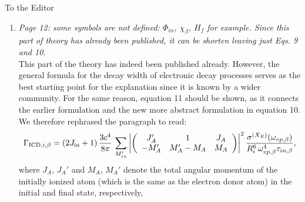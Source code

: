 \documentclass[DIN,pagenumber=false,parskip=half,fromalign=left,fromphone=true,fromemail=true,fromurl=false,fromlogo=false,fromrule=false]{scrlttr2}
\begin{document}
\begin{letter}{To the Editor}
\begin{enumerate}
  \item \emph{Page 12:
        some symbols are not defined: $\Phi_{in}$, $\chi_\beta$, $H_f$
        for example.
        Since this part of theory has already been published, it can be shorten
        leaving just Eqs. 9 and 10.}\\
        This part of the theory has indeed been published already. However,
        the general formula for the decay width of electronic decay processes
        serves as the best starting point for the explanation since it is
        known by a wider community. For the same reason, equation 11 should
        be shown, as it connects the earlier formulation and the new more
        abstract formulation in equation 10. We therefore rephrased the
        paragraph to read:\\
        {}
%
\begin{equation}
 \Gamma_{{\rm ICD},i,\beta} = (2J_{\rm in}+1)\, \frac{3c^4}{8\pi}\,
                        \sum\limits_{M_{in}'}
                        \left| \left(
                        \begin{array}{ccc}
                        J_A'  & 1        & J_A\\
                        -M_A' & M_A'-M_A & M_A
                        \end{array}\right) \right|^2
                        \frac{\sigma^{(X_E)}(\omega_{vp,\beta})}
                        {R_i^6 \, \omega_{vp,\beta}^4 \tau_{in,\beta}},
\end{equation}                                                 
%
where $J_A$, $J_A'$ and $M_A$, $M_A'$ denote the total angular momentum of the
initially ionized atom (which is the same as the electron donor atom) in the 
initial and final state, respectively,
{}
\end{enumerate}
\end{letter}
\end{document}
